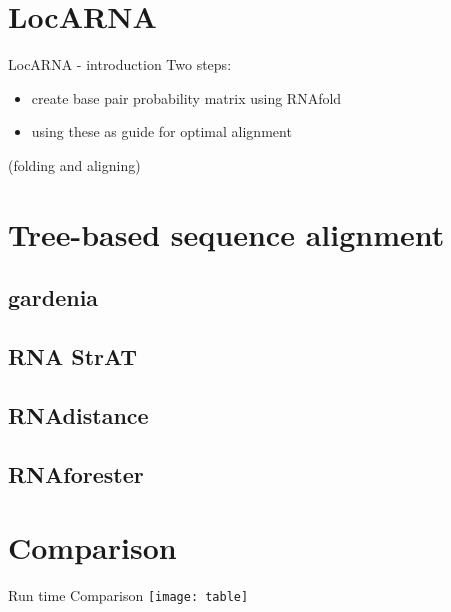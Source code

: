 



%


\section{LocARNA}

\begin{frame}[c]{LocARNA - introduction}
    Two steps:
    \begin{itemize}
    \pause
    \item create base pair probability matrix using RNAfold
    \pause
    \item using these as guide for optimal alignment
    \pause
    \end{itemize}
    (folding and aligning)
\end{frame}


\section{Tree-based sequence alignment}

\subsection{gardenia}

\subsection{RNA StrAT}

\subsection{RNAdistance}

\subsection{RNAforester}



\section{Comparison}

\begin{frame}[c]{Run time Comparison}
    \center
    \texttt{[image: table]}
\end{frame}

